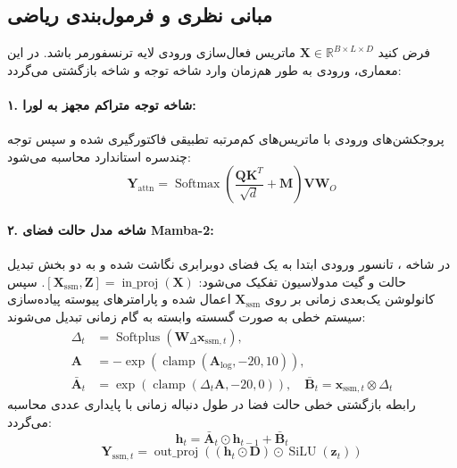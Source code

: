 \subsection{مبانی نظری و فرمول‌بندی ریاضی}
فرض کنید $\mathbf{X} \in \mathbb{R}^{B \times L \times D}$ ماتریس فعال‌سازی ورودی لایه ترنسفورمر باشد. در این معماری، ورودی به طور هم‌زمان وارد شاخه توجه و شاخه بازگشتی  می‌گردد:

\paragraph{۱. شاخه توجه متراکم مجهز به لورا:}
پروجکشن‌های ورودی با ماتریس‌های کم‌مرتبه تطبیقی فاکتورگیری شده و سپس توجه چندسره استاندارد محاسبه می‌شود:
\begin{equation}
\mathbf{Y}_{\text{attn}} = \operatorname{Softmax}\left(\frac{\mathbf{Q} \mathbf{K}^T}{\sqrt{d}} + \mathbf{M}\right) \mathbf{V} \mathbf{W}_O
\end{equation}

\paragraph{۲. شاخه مدل حالت فضای Mamba-2:}
در شاخه ، تانسور ورودی ابتدا به یک فضای دوبرابری نگاشت شده و به دو بخش تبدیل حالت و گیت مدولاسیون تفکیک می‌شود: $[\mathbf{X}_{\text{ssm}}, \mathbf{Z}] = \operatorname{in\_proj}(\mathbf{X})$. سپس کانولوشن یک‌بعدی زمانی بر روی $\mathbf{X}_{\text{ssm}}$ اعمال شده و پارامترهای پیوسته پیاده‌سازی سیستم خطی به صورت گسسته وابسته به گام زمانی تبدیل می‌شوند:
\begin{align}
\Delta_t &= \operatorname{Softplus}\left(\mathbf{W}_{\Delta} \mathbf{x}_{\text{ssm}, t}\right), \\
\mathbf{A} &= -\exp\left(\operatorname{clamp}(\mathbf{A}_{\text{log}}, -20, 10)\right), \\
\bar{\mathbf{A}}_t &= \exp\left(\operatorname{clamp}(\Delta_t \mathbf{A}, -20, 0)\right), \quad \bar{\mathbf{B}}_t = \mathbf{x}_{\text{ssm}, t} \otimes \Delta_t
\end{align}
رابطه بازگشتی خطی حالت فضا در طول دنباله زمانی با پایداری عددی محاسبه می‌گردد:
\begin{equation}
\mathbf{h}_t = \bar{\mathbf{A}}_t \odot \mathbf{h}_{t-1} + \bar{\mathbf{B}}_t
\end{equation}
\begin{equation}
\mathbf{Y}_{\text{ssm}, t} = \operatorname{out\_proj}\left( \left(\mathbf{h}_t \odot \mathbf{D}\right) \odot \operatorname{SiLU}(\mathbf{z}_t) \right)
\end{equation}

